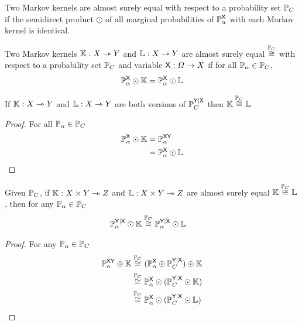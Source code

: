 Two Markov kernels are almost surely equal with respect to a probability set $\mathbb{P}_C$ if the semidirect product $\odot$ of all marginal probabilities of $\mathbb{P}_\alpha^{\mathsf{X}}$ with each Markov kernel is identical.

\begin{definition}\label{def:asequal}
Two Markov kernels $\mathbb{K}:X\rightarrowtriangle Y$ and $\mathbb{L}:X\rightarrowtriangle Y$ are almost surely equal $\overset{\mathbb{P}_C}{\cong}$ with respect to a probability set $\mathbb{P}_C$ and variable $\mathsf{X}:\Omega\to X$ if for all $\mathbb{P}_\alpha \in \mathbb{P}_C$,
\begin{align}
    \mathbb{P}^{\mathsf{X}}_\alpha\odot \mathbb{K}=\mathbb{P}^{\mathsf{X}}_\alpha\odot \mathbb{L}
\end{align}
\end{definition}

\begin{lemma}
If $\mathbb{K}:X\rightarrowtriangle Y$ and $\mathbb{L}:X\rightarrowtriangle Y$ are both versions of $\mathbb{P}_C^{\mathsf{Y}|\mathsf{X}}$ then $\mathbb{K}\overset{\mathbb{P}_C}{\cong}\mathbb{L}$
\end{lemma}

\begin{proof}
For all $\mathbb{P}_\alpha \in \mathbb{P}_C$
\begin{align}
    \mathbb{P}^{\mathsf{X}}_\alpha\odot \mathbb{K} &= \mathbb{P}^{\mathsf{XY}}_\alpha\\
    &= \mathbb{P}^{\mathsf{X}}_\alpha\odot \mathbb{L}
\end{align}
\end{proof}

\begin{lemma}\label{lem:sub_asequal}
Given $\mathbb{P}_C$, if $\mathbb{K}:X\times Y \rightarrowtriangle Z$ and $\mathbb{L}:X\times Y \rightarrowtriangle Z$ are almost surely equal $\mathbb{K}\overset{\mathbb{P}_C}{\cong}\mathbb{L}$, then for any $\mathbb{P}_\alpha\in \mathbb{P}_C$
\begin{align}
    \mathbb{P}_\alpha^{\mathsf{Y}|\mathsf{X}}\odot \mathbb{K} &\overset{\mathbb{P}_C}{\cong} \mathbb{P}_\alpha^{\mathsf{Y}|\mathsf{X}}\odot \mathbb{L}
\end{align}
\end{lemma}

\begin{proof}
For any $\mathbb{P}_\alpha\in\mathbb{P}_C$
\begin{align}
    \mathbb{P}_\alpha^{\mathsf{XY}}\odot \mathbb{K} &\overset{\mathbb{P}_C}{\cong} (\mathbb{P}_\alpha^{\mathsf{X}}\odot \mathbb{P}_C^{\mathsf{Y}|\mathsf{X}})\odot \mathbb{K}\\
                                              &\overset{\mathbb{P}_C}{\cong} \mathbb{P}_\alpha^{\mathsf{X}}\odot (\mathbb{P}_C^{\mathsf{Y}|\mathsf{X}}\odot \mathbb{K})\\
                                              &\overset{\mathbb{P}_C}{\cong} \mathbb{P}_\alpha^{\mathsf{X}}\odot (\mathbb{P}_C^{\mathsf{Y}|\mathsf{X}}\odot \mathbb{L})
\end{align}
\end{proof}

